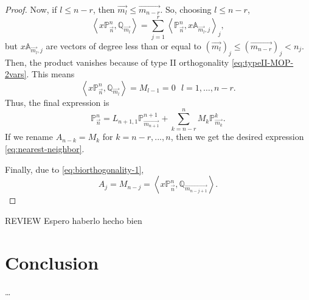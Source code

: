 \documentclass[12pt,a4]{article}
\theoremstyle{plain}
\newcommand{\cb}[1]{{\color{blue}#1}}
\newcommand{\prodesc}[2]{\left\langle #1 , #2 \right\rangle}
\begin{document}
\begin{proof}
    Now, if $l\leq n-r$, then $\overrightarrow{m_l}\leq \overrightarrow{m_{n-r}}$. So, choosing $l\leq n-r$,
    $$
    \prodesc{x\mathbb P_{\vec n}^n}{\mathbb Q_{\overrightarrow{m_l}}} = \sum_{j=1}^r  \prodesc{\mathbb P_{\vec n}^n}{x\mathbb A_{\overrightarrow{m_l},j}}_j,
    $$
    but $x\mathbb A_{\overrightarrow{m_l},j}$ are vectors of degree less than or equal to $(\overrightarrow{m_l})_j\leq (\overrightarrow{m_{n-r}})_j < n_j$. Then, the product vanishes because of type II orthogonality \eqref{eq:typeII-MOP-2vars}. This means
    $$
    \prodesc{x\mathbb P_{\vec n}^n}{\mathbb Q_{\overrightarrow{m_l}}} = M_{l-1} = 0 \ \ \ l = 1, \dots, n-r.
    $$
    Thus, the final expression is
    $$
    \mathbb P_{\overrightarrow{n}}^n = L_{n+1,1}\mathbb P_{\overrightarrow{m_{n+1}}}^{n+1} + \sum_{k=n-r}^{n} M_k \mathbb P_{\overrightarrow{m_k}}^k.
    $$
    If we rename $A_{n-k} = M_k$ for $k=n-r,...,n$, then we get the desired expression \eqref{eq:nearest-neighbor}. 

    Finally, due to \eqref{eq:biorthogonality-1}, $$A_j = M_{n-j} =  \prodesc{x\mathbb P_{\vec n}^n}{\mathbb Q_{\overrightarrow{m_{n-j+1}}}}.$$
\end{proof}
\cb{REVIEW Espero haberlo hecho bien}


\section{Conclusion}
\dots

\nocite{*}
{}

\end{document}
